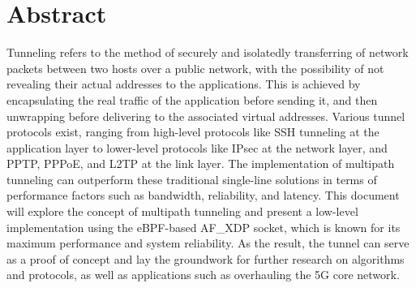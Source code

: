 \chapter*{Abstract}

Tunneling refers to the method of securely and isolatedly transferring of network packets between two hosts over a public network, with the possibility of not revealing their actual addresses to the applications. 
This is achieved by encapsulating the real traffic of the application before sending it, and then unwrapping before delivering to the associated virtual addresses.
Various tunnel protocols exist, ranging from high-level protocols like SSH tunneling at the application layer to lower-level protocols like IPsec at the network layer, and PPTP, PPPoE, and L2TP at the link layer.
The implementation of multipath tunneling can outperform these traditional single-line solutions in terms of performance factors such as bandwidth, reliability, and latency.
This document will explore the concept of multipath tunneling and present a low-level implementation using the eBPF-based AF\_XDP socket, which is known for its maximum performance and system reliability.
As the result, the tunnel can serve as a proof of concept and lay the groundwork for further research on algorithms and protocols, as well as applications such as overhauling the 5G core network. 







